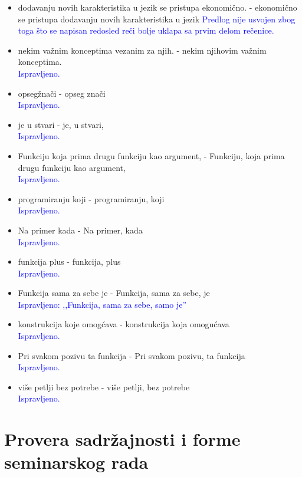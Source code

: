 \documentclass[a4paper]{report}
\newcommand{\odgovorAutora}[1]{\textcolor{blue}{#1}}
\begin{document}
\begin{itemize}
  \item dodavanju novih karakteristika u jezik se pristupa ekonomično. - ekonomično se pristupa dodavanju novih karakteristika u jezik
  \odgovorAutora{Predlog nije usvojen zbog toga što se napisan redosled reči bolje uklapa sa prvim delom rečenice.}
  \item nekim važnim konceptima vezanim za njih.  - nekim njihovim važnim konceptima.\\
  \odgovorAutora{Ispravljeno.}
  \item opsegžnači -  opseg znači \\
  \odgovorAutora{Ispravljeno.}
  \item  je u stvari - je, u stvari,\\
  \odgovorAutora{Ispravljeno.}
  \item  Funkciju koja prima drugu funkciju kao argument, - Funkciju, koja prima drugu funkciju kao argument,\\
  \odgovorAutora{Ispravljeno.}
  \item programiranju koji - programiranju, koji\\
  \odgovorAutora{Ispravljeno.}
  \item  Na primer kada -  Na primer, kada\\
  \odgovorAutora{Ispravljeno.}
  \item   funkcija plus -  funkcija, plus\\
  \odgovorAutora{Ispravljeno.}
  \item  Funkcija sama za sebe je - Funkcija, sama za sebe, je \\
  \odgovorAutora{Ispravljeno: ,,Funkcija, sama za sebe, samo je''}     
  \item  konstrukcija koje omogćava - konstrukcija koja omogućava\\
  \odgovorAutora{Ispravljeno.}
  \item   Pri svakom pozivu ta funkcija  -  Pri svakom pozivu, ta funkcija\\
  \odgovorAutora{Ispravljeno.}
  \item  više petlji bez potrebe - više petlji, bez potrebe\\
  \odgovorAutora{Ispravljeno.}
\end{itemize}

\section{Provera sadržajnosti i forme seminarskog rada}
\end{document}
